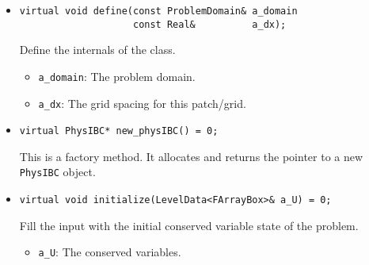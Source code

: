 \begin{itemize}

\item \begin{small}\begin{verbatim}
virtual void define(const ProblemDomain& a_domain
                    const Real&          a_dx);
\end{verbatim}\end{small}
Define the internals of the class.
\begin{itemize}
\item \verb/a_domain/:  The problem domain.
\vspace{-0.07in}
\item \verb/a_dx/:  The grid spacing for this patch/grid.
\end{itemize}

\item \begin{small}\begin{verbatim}
virtual PhysIBC* new_physIBC() = 0;
\end{verbatim}\end{small}
This is a factory method.  It allocates and returns the pointer to a
new {\tt PhysIBC} object. 

\item \begin{small}\begin{verbatim}
virtual void initialize(LevelData<FArrayBox>& a_U) = 0;
\end{verbatim}\end{small}
Fill the input with the initial conserved variable state of the problem.
\begin{itemize}
\item \verb/a_U/:  The conserved variables.
\end{itemize}


\end{itemize}
